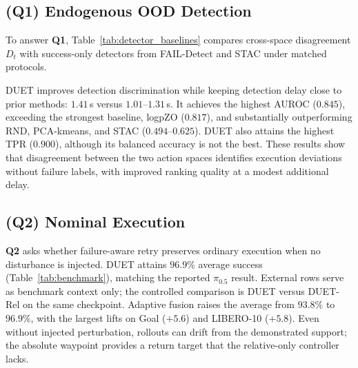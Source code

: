 \documentclass[letterpaper, 10 pt, conference]{ieeeconf}
\begin{document}
\subsection{\textbf{(Q1)} Endogenous OOD Detection}
\label{sec:detection}
To answer \textbf{Q1}, Table~\ref{tab:detector_baselines} compares cross-space disagreement $D_t$ with success-only detectors from FAIL-Detect \cite{faildetect} and STAC \cite{sentinel} under matched protocols.

DUET improves detection discrimination while keeping detection delay close to prior methods: $1.41$\,s versus $1.01$--$1.31$\,s. It achieves the highest AUROC ($0.845$), exceeding the strongest baseline, logpZO ($0.817$), and substantially outperforming RND, PCA-kmeans, and STAC ($0.494$--$0.625$). DUET also attains the highest TPR ($0.900$), although its balanced accuracy is not the best. These results show that disagreement between the two action spaces identifies execution deviations without failure labels, with improved ranking quality at a modest additional delay.


\subsection{\textbf{(Q2)} Nominal Execution}
\label{sec:nominal}
\textbf{Q2} asks whether failure-aware retry preserves ordinary execution when no disturbance is injected. DUET attains $96.9\%$ average success (Table~\ref{tab:benchmark}), matching the reported $\pi_{0.5}$ result. External rows serve as benchmark context only; the controlled comparison is DUET versus DUET-Rel on the same checkpoint. Adaptive fusion raises the average from $93.8\%$ to $96.9\%$, with the largest lifts on Goal ($+5.6$) and LIBERO-10 ($+5.8$). Even without injected perturbation, rollouts can drift from the demonstrated support; the absolute waypoint provides a return target that the relative-only controller lacks.

\begin{table}[t]
\caption{Nominal task success (\%) on LIBERO. External rows are reported results and are included only for benchmark context. StarVLA uses joint $30$k training; DUET uses suite-specific $10$k checkpoints.}
\label{tab:benchmark}
\centering
{}
\end{table}
\end{document}
